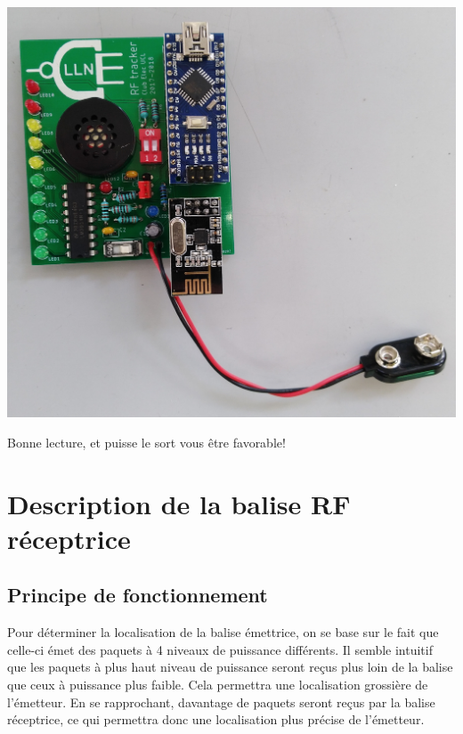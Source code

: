 \documentclass[a4paper,10pt,twoside]{article}
\begin{document}
\begin{minipage}[c]{.49\textwidth}
	\centering
	\includegraphics[width=\textwidth]{imgs/RF_TAG.jpg}
	\label{fig:RF_TAG}
\end{minipage}
\vspace{1cm}

\begin{center}
Bonne lecture, et puisse le sort vous être favorable!
\end{center}

\section{Description de la balise RF réceptrice}
\subsection{Principe de fonctionnement}
Pour déterminer la localisation de la balise émettrice, on se base sur le fait que celle-ci émet des paquets à 4 niveaux de puissance différents. Il semble intuitif que les paquets à plus haut niveau de puissance seront reçus plus loin de la balise que ceux à puissance plus faible. Cela permettra une localisation grossière de l'émetteur. En se rapprochant, davantage de paquets seront reçus par la balise réceptrice, ce qui permettra donc une localisation plus précise de l'émetteur.\\
\end{document}
